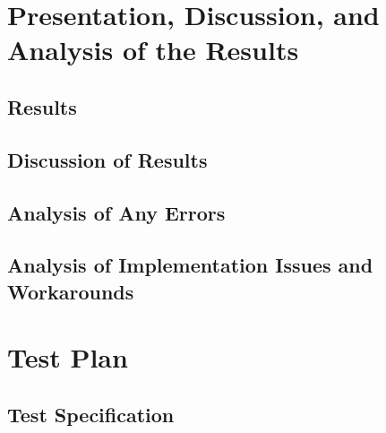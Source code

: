 \documentclass[12pt]{article} %
\begin{document}
\section{Presentation, Discussion, and Analysis of the Results}
%
%
\subsection{Results } %

\subsection{Discussion of Results } %

\subsection{Analysis of Any Errors } %
%

\subsection{Analysis of Implementation Issues and Workarounds} %
%
%

\section{Test Plan } %
%

\subsection{Test Specification} %
%
%
\end{document}
